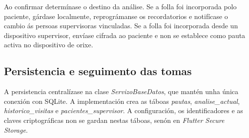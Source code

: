 Ao confirmar determínase o destino da análise. Se a folla foi incorporada polo paciente, gárdase localmente, reprográmanse os recordatorios e notifícase o cambio ás persoas supervisoras vinculadas. Se a folla foi incorporada desde un dispositivo supervisor, envíase cifrada ao paciente e non se establece como pauta activa no dispositivo de orixe.

%
%
%



\subsection{Persistencia e seguimento das tomas}

A persistencia centralízase na clase \textit{ServizoBaseDatos}, que mantén unha única conexión con SQLite. A implementación crea as táboas \textit{pautas}, \textit{analise\_actual}, \textit{historico\_visitas} e \textit{pacientes\_supervisor}. A configuración, os identificadores e as claves criptográficas non se gardan nestas táboas, senón en \textit{Flutter Secure Storage}.

